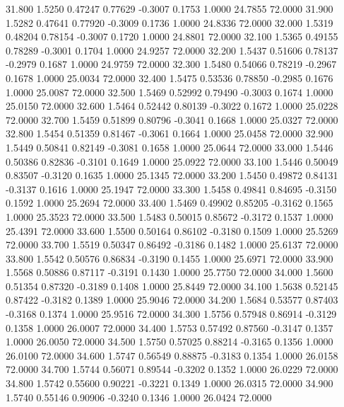   31.800   1.5250   0.47247   0.77629  -0.3007   0.1753   1.0000  24.7855  72.0000
  31.900   1.5282   0.47641   0.77920  -0.3009   0.1736   1.0000  24.8336  72.0000
  32.000   1.5319   0.48204   0.78154  -0.3007   0.1720   1.0000  24.8801  72.0000
  32.100   1.5365   0.49155   0.78289  -0.3001   0.1704   1.0000  24.9257  72.0000
  32.200   1.5437   0.51606   0.78137  -0.2979   0.1687   1.0000  24.9759  72.0000
  32.300   1.5480   0.54066   0.78219  -0.2967   0.1678   1.0000  25.0034  72.0000
  32.400   1.5475   0.53536   0.78850  -0.2985   0.1676   1.0000  25.0087  72.0000
  32.500   1.5469   0.52992   0.79490  -0.3003   0.1674   1.0000  25.0150  72.0000
  32.600   1.5464   0.52442   0.80139  -0.3022   0.1672   1.0000  25.0228  72.0000
  32.700   1.5459   0.51899   0.80796  -0.3041   0.1668   1.0000  25.0327  72.0000
  32.800   1.5454   0.51359   0.81467  -0.3061   0.1664   1.0000  25.0458  72.0000
  32.900   1.5449   0.50841   0.82149  -0.3081   0.1658   1.0000  25.0644  72.0000
  33.000   1.5446   0.50386   0.82836  -0.3101   0.1649   1.0000  25.0922  72.0000
  33.100   1.5446   0.50049   0.83507  -0.3120   0.1635   1.0000  25.1345  72.0000
  33.200   1.5450   0.49872   0.84131  -0.3137   0.1616   1.0000  25.1947  72.0000
  33.300   1.5458   0.49841   0.84695  -0.3150   0.1592   1.0000  25.2694  72.0000
  33.400   1.5469   0.49902   0.85205  -0.3162   0.1565   1.0000  25.3523  72.0000
  33.500   1.5483   0.50015   0.85672  -0.3172   0.1537   1.0000  25.4391  72.0000
  33.600   1.5500   0.50164   0.86102  -0.3180   0.1509   1.0000  25.5269  72.0000
  33.700   1.5519   0.50347   0.86492  -0.3186   0.1482   1.0000  25.6137  72.0000
  33.800   1.5542   0.50576   0.86834  -0.3190   0.1455   1.0000  25.6971  72.0000
  33.900   1.5568   0.50886   0.87117  -0.3191   0.1430   1.0000  25.7750  72.0000
  34.000   1.5600   0.51354   0.87320  -0.3189   0.1408   1.0000  25.8449  72.0000
  34.100   1.5638   0.52145   0.87422  -0.3182   0.1389   1.0000  25.9046  72.0000
  34.200   1.5684   0.53577   0.87403  -0.3168   0.1374   1.0000  25.9516  72.0000
  34.300   1.5756   0.57948   0.86914  -0.3129   0.1358   1.0000  26.0007  72.0000
  34.400   1.5753   0.57492   0.87560  -0.3147   0.1357   1.0000  26.0050  72.0000
  34.500   1.5750   0.57025   0.88214  -0.3165   0.1356   1.0000  26.0100  72.0000
  34.600   1.5747   0.56549   0.88875  -0.3183   0.1354   1.0000  26.0158  72.0000
  34.700   1.5744   0.56071   0.89544  -0.3202   0.1352   1.0000  26.0229  72.0000
  34.800   1.5742   0.55600   0.90221  -0.3221   0.1349   1.0000  26.0315  72.0000
  34.900   1.5740   0.55146   0.90906  -0.3240   0.1346   1.0000  26.0424  72.0000
